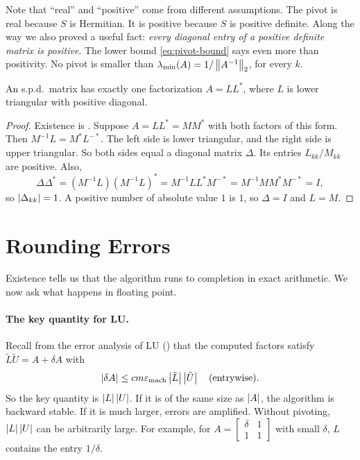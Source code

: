 Note that ``real'' and ``positive'' come from different assumptions. The pivot is real because $S$ is Hermitian. It is positive because $S$ is positive definite. Along the way we also proved a useful fact: \emph{every diagonal entry of a positive definite matrix is positive}. The lower bound \eqref{eq:pivot-bound} says even more than positivity. No pivot is smaller than $\lambda_{\min}(A) = 1/\left\lVert A^{-1} \right\rVert_2$, for every $k$.

\begin{corollary}
  \label{cor:chol-unique}
  An s.p.d.\ matrix has exactly one factorization $A = LL^\ast$, where $L$ is lower triangular with positive diagonal.
\end{corollary}

\begin{proof}
  Existence is . Suppose $A = LL^\ast = MM^\ast$ with both factors of this form. Then $M^{-1}L = M^\ast L^{-\ast}$. The left side is lower triangular, and the right side is upper triangular. So both sides equal a diagonal matrix $\Delta$. Its entries $L_{kk}/M_{kk}$ are positive. Also,
  \begin{equation}
    \Delta\Delta^\ast = (M^{-1}L)(M^{-1}L)^\ast = M^{-1}LL^\ast M^{-\ast} = M^{-1}MM^\ast M^{-\ast} = I,
  \end{equation}
  so $\left\lvert \Delta_{kk} \right\rvert = 1$. A positive number of absolute value $1$ is $1$, so $\Delta = I$ and $L = M$.
\end{proof}

\section{Rounding Errors}
\label{sec:chol-errors}

Existence tells us that the algorithm runs to completion in exact arithmetic. We now ask what happens in floating point.

\paragraph{The key quantity for LU.} Recall from the error analysis of LU () that the computed factors satisfy $\tilde{L}\tilde{U} = A + \delta A$ with
\begin{equation}
  \left\lvert \delta A \right\rvert \le cm\varepsilon_{\mathrm{mach}}\left\lvert \tilde{L} \right\rvert\left\lvert \tilde{U} \right\rvert \quad \text{(entrywise)}.
\end{equation}
So the key quantity is $\left\lvert L \right\rvert\left\lvert U \right\rvert$. If it is of the same size as $\left\lvert A \right\rvert$, the algorithm is backward stable. If it is much larger, errors are amplified. Without pivoting, $\left\lvert L \right\rvert\left\lvert U \right\rvert$ can be arbitrarily large. For example, for $A = \left[\begin{smallmatrix} \delta & 1 \\ 1 & 1 \end{smallmatrix}\right]$ with small $\delta$, $L$ contains the entry $1/\delta$.

